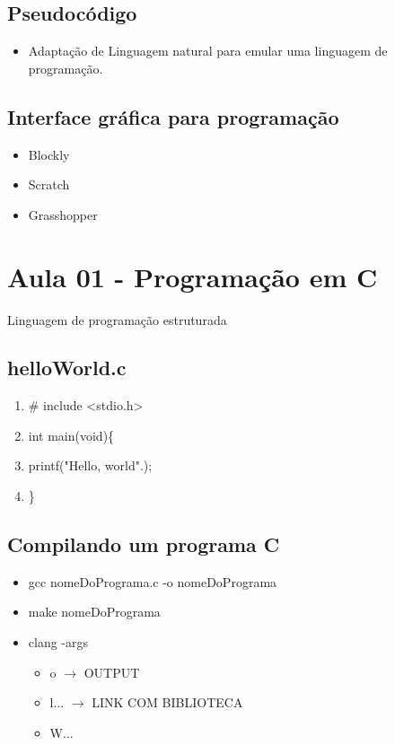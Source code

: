 \documentclass[12pt,a4paper]{article} %
\begin{document}
\subsection{Pseudocódigo}
\begin{itemize}
\item Adaptação de Linguagem natural para emular uma linguagem de programação.
\end{itemize}

\subsection{Interface gráfica para programação}
\begin{itemize}
\item Blockly
\item Scratch
\item Grasshopper
\end{itemize}

\section{Aula 01 - Programação em C}
Linguagem de programação estruturada

\subsection{helloWorld.c}
\begin{enumerate}
\item \# include <stdio.h>
\item int main(void)\{
\item \tabto{1.1cm}printf("Hello, world".);
\item \}
\end{enumerate}

\subsection{Compilando um programa C}
\begin{itemize}
\item gcc nomeDoPrograma.c -o nomeDoPrograma
\item make nomeDoPrograma
\item clang -args
\begin{itemize}
\item o $\longrightarrow$ OUTPUT
\item l... $\longrightarrow$ LINK COM BIBLIOTECA
\item W...

\end{itemize}
\end{itemize}
\end{document}

